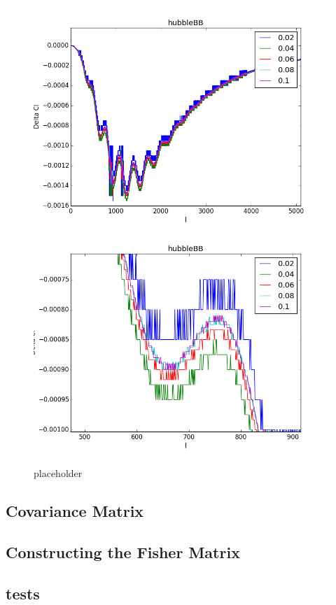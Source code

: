 \begin{figure}
\centering
\includegraphics[scale=0.5]{images/diffs/H0bb.png}
\includegraphics[scale=0.5]{images/diffs/H0bbz.png}
\caption{placeholder}
\end{figure}

\subsection{Covariance Matrix}
\subsection{Constructing the Fisher Matrix}
\subsection{tests}
